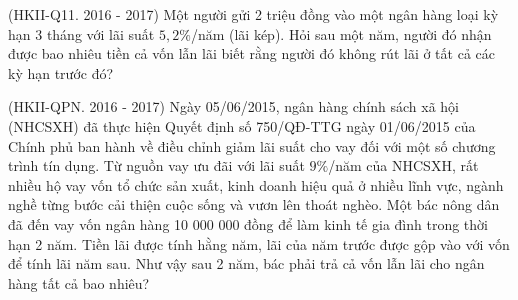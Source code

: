 \begin{bt}%
	{(HKII-Q11. 2016 - 2017)} Một người gửi 2 triệu đồng vào một ngân hàng loại kỳ hạn 3 tháng với lãi suất $5{,}2\%$/năm (lãi kép). Hỏi sau một năm, người đó nhận được bao nhiêu tiền cả vốn lẫn lãi biết rằng người đó không rút lãi ở tất cả các kỳ hạn trước đó?
\end{bt}

\begin{bt}%
	{(HKII-QPN. 2016 - 2017)} Ngày 05/06/2015, ngân hàng chính sách xã hội (NHCSXH) đã thực hiện Quyết định số 750/QĐ-TTG ngày 01/06/2015 của Chính phủ ban hành về điều chỉnh giảm lãi suất cho vay đối với một số chương trình tín dụng. Từ nguồn vay ưu đãi với lãi suất $9\%$/năm của NHCSXH, rất nhiều hộ vay vốn tổ chức sản xuất, kinh doanh hiệu quả ở nhiều lĩnh vực, ngành nghề từng bước cải thiện cuộc sống và vươn lên thoát nghèo. Một bác nông dân đã đến vay vốn ngân hàng 10 000 000 đồng để làm kinh tế gia đình trong thời hạn 2 năm. Tiền lãi được tính hằng năm, lãi của năm trước được gộp vào với vốn để tính lãi năm sau. Như vậy sau 2 năm, bác phải trả cả vốn lẫn lãi cho ngân hàng tất cả bao nhiêu?
\end{bt}

